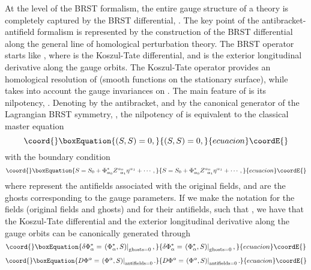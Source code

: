 \documentclass[a4paper,12pt]{article}
\begin{document}
At the level of the BRST formalism, the entire gauge structure of a theory
is completely captured by the BRST differential, \coordHE{}. The key point of the
antibracket-antifield formalism is represented by the construction of the
BRST differential along the general line of homological perturbation theory.
The BRST operator starts like \coordHE{}, where \myHighlight{$\delta $}\coordHE{} is the
Koszul-Tate differential, and \coordHE{} is the exterior longitudinal derivative
along the gauge orbits. The Koszul-Tate operator provides an homological
resolution of \coordHE{} (smooth functions on the
stationary surface), while \coordHE{} takes into account the gauge invariances on \myHighlight{$%
\Sigma $}\coordHE{}. The main feature of \coordHE{} is its nilpotency, \coordHE{}. Denoting by \myHighlight{$%
\left( ,\right) $}\coordHE{} the antibracket, and by \coordHE{} the canonical generator of the
Lagrangian BRST symmetry, \coordHE{}, the
nilpotency of \coordHE{} is equivalent to the classical master equation 
\begin{equation}\coord{}\boxEquation{
\left( S,S\right) =0,  \label{sp3.d1}
}{
\left( S,S\right) =0,  }{ecuacion}\coordE{}\end{equation}
with the boundary condition 
\begin{equation}\coord{}\boxEquation{
S=S_{0}+\Phi _{\alpha _{0}}^{*}Z_{\;\;\alpha _{1}}^{\alpha _{0}}\eta
^{\alpha _{1}}+\cdots ,  \label{sp3.d2}
}{
S=S_{0}+\Phi _{\alpha _{0}}^{*}Z_{\;\;\alpha _{1}}^{\alpha _{0}}\eta
^{\alpha _{1}}+\cdots ,  }{ecuacion}\coordE{}\end{equation}
where \coordHE{} represent the antifields associated with the
original fields, and \coordHE{} are the ghosts corresponding to
the gauge parameters. If we make the notation \myHighlight{$\Phi ^{\alpha }$}\coordHE{} for the
fields (original fields and ghosts) and \myHighlight{$\Phi _{\alpha }^{*}$}\coordHE{} for their
antifields, such that \myHighlight{$\left( \Phi ^{\alpha },\Phi _{\beta }^{*}\right)
=\delta _{\beta }^{\alpha }$}\coordHE{}, we have that the Koszul-Tate differential and
the exterior longitudinal derivative along the gauge orbits can be
canonically generated through 
\begin{equation}\coord{}\boxEquation{
\delta \Phi _{\alpha }^{*}=\left. \left( \Phi _{\alpha }^{*},S\right)
\right| _{\mathrm{ghosts}=0},  \label{sp3.d3}
}{
\delta \Phi _{\alpha }^{*}=\left. \left( \Phi _{\alpha }^{*},S\right)
\right| _{\mathrm{ghosts}=0},  }{ecuacion}\coordE{}\end{equation}
\begin{equation}\coord{}\boxEquation{
D\Phi ^{\alpha }=\left. \left( \Phi ^{\alpha },S\right) \right| _{\mathrm{
antifields}=0}.  \label{sp3.d4}
}{
D\Phi ^{\alpha }=\left. \left( \Phi ^{\alpha },S\right) \right| _{\mathrm{
antifields}=0}.  }{ecuacion}\coordE{}\end{equation}
\end{document}
